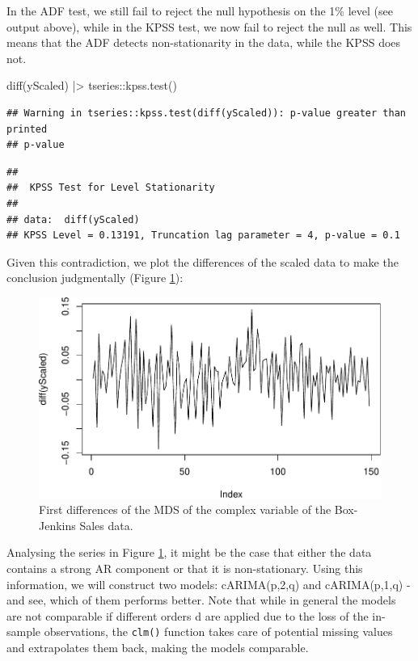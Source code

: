 \documentclass[
]{book}
\newenvironment{Shaded}{\begin{snugshade}}{\end{snugshade}}
\newcommand{\FunctionTok}[1]{\textcolor[rgb]{0.00,0.00,0.00}{#1}}
\newcommand{\NormalTok}[1]{#1}
\newcommand{\SpecialCharTok}[1]{\textcolor[rgb]{0.00,0.00,0.00}{#1}}
\begin{document}
In the ADF test, we still fail to reject the null hypothesis on the 1\% level (see output above), while in the KPSS test, we now fail to reject the null as well. This means that the ADF detects non-stationarity in the data, while the KPSS does not.

\begin{Shaded}
\begin{Highlighting}[]
\FunctionTok{diff}\NormalTok{(yScaled) }\SpecialCharTok{|\textgreater{}}
\NormalTok{    tseries}\SpecialCharTok{::}\FunctionTok{kpss.test}\NormalTok{()}
\end{Highlighting}
\end{Shaded}

\begin{verbatim}
## Warning in tseries::kpss.test(diff(yScaled)): p-value greater than printed
## p-value
\end{verbatim}

\begin{verbatim}
## 
##  KPSS Test for Level Stationarity
## 
## data:  diff(yScaled)
## KPSS Level = 0.13191, Truncation lag parameter = 4, p-value = 0.1
\end{verbatim}

Given this contradiction, we plot the differences of the scaled data to make the conclusion judgmentally (Figure \ref{fig:BJSalesComplexDiffs}):

\begin{figure}
\centering
\includegraphics{Svetunkov---Svetunkov---Complex-Valued-Econometrics_files/figure-latex/BJSalesComplexDiffs-1.pdf}
\caption{\label{fig:BJSalesComplexDiffs}First differences of the MDS of the complex variable of the Box-Jenkins Sales data.}
\end{figure}

Analysing the series in Figure \ref{fig:BJSalesComplexDiffs}, it might be the case that either the data contains a strong AR component or that it is non-stationary. Using this information, we will construct two models: cARIMA(p,2,q) and cARIMA(p,1,q) - and see, which of them performs better. Note that while in general the models are not comparable if different orders d are applied due to the loss of the in-sample observations, the \texttt{clm()} function takes care of potential missing values and extrapolates them back, making the models comparable.
\end{document}
